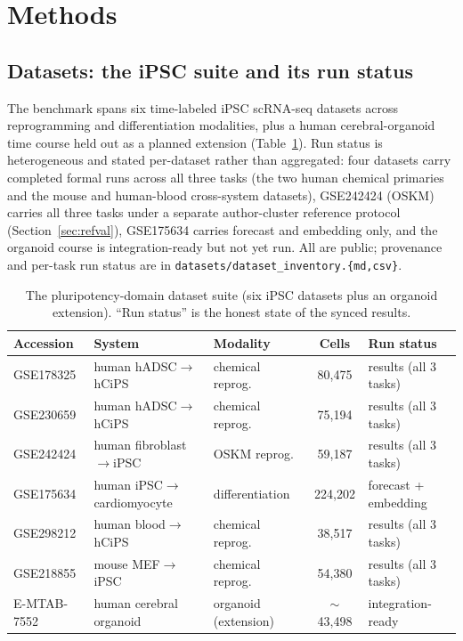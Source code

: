 \documentclass[11pt]{article}
\newcommand{\code}[1]{\texttt{\small #1}}
\begin{document}
\section{Methods}

\subsection{Datasets: the iPSC suite and its run status}
The benchmark spans six time-labeled iPSC scRNA-seq datasets across reprogramming and
differentiation modalities, plus a human cerebral-organoid time course held out as a
planned extension (Table~\ref{tab:data}). Run status is heterogeneous and stated
per-dataset rather than aggregated: four datasets carry completed formal runs across
all three tasks (the two human chemical primaries and the mouse and human-blood
cross-system datasets), GSE242424 (OSKM) carries all three tasks under a separate
author-cluster reference protocol (Section~\ref{sec:refval}), GSE175634 carries
forecast and embedding only, and the organoid course is integration-ready but not yet
run. All are public; provenance and per-task run status are in
\code{datasets/dataset\_inventory.\{md,csv\}}.

\begin{table}[ht]
\centering
\caption{The pluripotency-domain dataset suite (six iPSC datasets plus an organoid
extension). ``Run status'' is the honest state of the synced results.}
\label{tab:data}
\small
\begin{tabular}{l l l c l}
\toprule
Accession & System & Modality & Cells & Run status \\
\midrule
GSE178325 & human hADSC$\to$hCiPS & chemical reprog. & 80{,}475 & results (all 3 tasks) \\
GSE230659 & human hADSC$\to$hCiPS & chemical reprog. & 75{,}194 & results (all 3 tasks) \\
GSE242424 & human fibroblast$\to$iPSC & OSKM reprog. & 59{,}187 & results (all 3 tasks) \\
GSE175634 & human iPSC$\to$cardiomyocyte & differentiation & 224{,}202 & forecast + embedding \\
GSE298212 & human blood$\to$hCiPS & chemical reprog. & 38{,}517 & results (all 3 tasks) \\
GSE218855 & mouse MEF$\to$iPSC & chemical reprog. & 54{,}380 & results (all 3 tasks) \\
\midrule
E-MTAB-7552 & human cerebral organoid & organoid (extension) & $\sim$43{,}498 & integration-ready \\
\bottomrule
\end{tabular}
\end{table}
\end{document}
